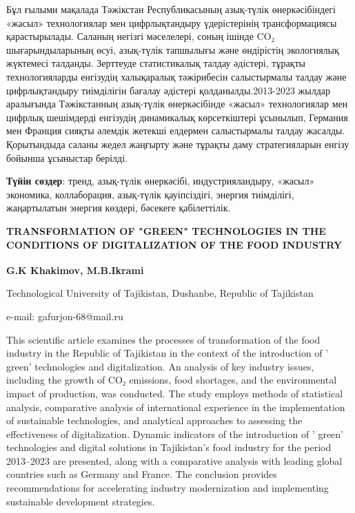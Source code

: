 Бұл ғылыми мақалада Тәжікстан Республикасының азық-түлік өнеркәсібіндегі
«жасыл» технологиялар мен цифрлықтандыру үдерістерінің трансформациясы
қарастырылады. Саланың негізгі мәселелері, соның ішінде CO₂
шығарындыларының өсуі, азық-түлік тапшылығы және өндірістің экологиялық
жүктемесі талданды. Зерттеуде статистикалық талдау әдістері, тұрақты
технологияларды енгізудің халықаралық тәжірибесін салыстырмалы талдау
және цифрлықтандыру тиімділігін бағалау әдістері қолданылды.2013-2023
жылдар аралығында Тәжікстанның азық-түлік өнеркәсібінде «жасыл»
технологиялар мен цифрлық шешімдерді енгізудің динамикалық көрсеткіштері
ұсынылып, Германия мен Франция сияқты әлемдік жетекші елдермен
салыстырмалы талдау жасалды. Қорытындыда саланы жедел жаңғырту және
тұрақты даму стратегияларын енгізу бойынша ұсыныстар берілді.

{\bfseries Түйін сөздер}: тренд, азық-түлік өнеркәсібі, индустрияландыру,
«жасыл» экономика, коллаборация, азық-түлік қауіпсіздігі, энергия
тиімділігі, жаңартылатын энергия көздері, бәсекеге қабілеттілік.

\begin{articleheader}
{\bfseries TRANSFORMATION OF "GREEN" TECHNOLOGIES IN THE CONDITIONS OF DIGITALIZATION OF THE FOOD INDUSTRY}

{\bfseries
G.K Khakimov\textsuperscript{\envelope },
M.B.Ikrami
}
\end{articleheader}

\begin{affiliation}
Technological University of Tajikistan, Dushanbe, Republic of Tajikistan

e-mail: gafurjon-68@mail.ru
\end{affiliation}

This scientific article examines the processes of transformation of the
food industry in the Republic of Tajikistan in the context of the
introduction of ' green'{} technologies
and digitalization. An analysis of key industry issues, including the
growth of CO₂ emissions, food shortages, and the environmental impact of
production, was conducted. The study employs methods of statistical
analysis, comparative analysis of international experience in the
implementation of sustainable technologies, and analytical approaches to
assessing the effectiveness of digitalization. Dynamic indicators of the
introduction of ' green'{} technologies
and digital solutions in Tajikistan's food industry for the period
2013--2023 are presented, along with a comparative analysis with leading
global countries such as Germany and France. The conclusion provides
recommendations for accelerating industry modernization and implementing
sustainable development stra\-tegies.

